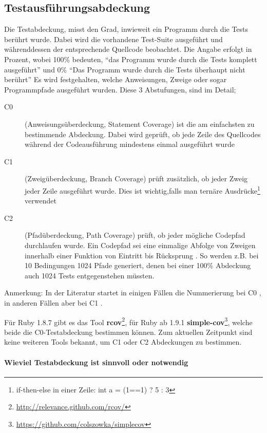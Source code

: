 \subsection{Testausführungsabdeckung}
\label{sec:coverage}
Die Testabdeckung, misst den Grad, inwieweit ein Programm durch die Tests berührt wurde. Dabei wird die vorhandene Test-Suite ausgeführt und währenddessen der entsprechende Quellcode beobachtet. Die Angabe erfolgt in Prozent, wobei 100\% bedeuten, "`das Programm wurde durch die Tests komplett ausgeführt"' und 0\% "`Das Programm wurde durch die Tests überhaupt nicht berührt"'  Es wird festgehalten, welche Anweisungen, Zweige oder sogar Programmpfade ausgeführt wurden. Diese 3 Abstufungen, sind im Detail;
\begin{description}
 \item[C0] (Anweisungsüberdeckung, Statement Coverage) ist die am einfachsten zu bestimmende Abdeckung. Dabei wird geprüft, ob jede Zeile des Quellcodes während der Codeausführung mindestens einmal ausgeführt wurde
 \item[C1] (Zweigüberdeckung, Branch Coverage) prüft zusätzlich, ob jeder Zweig jeder Zeile ausgeführt wurde. Dies ist wichtig,falls man ternäre Ausdrücke\footnote{if-then-else in einer Zeile: int a = (1==1) ? 5 : 3} verwendet
 \item[C2] (Pfadüberdeckung, Path Coverage) prüft, ob jeder mögliche Codepfad durchlaufen wurde. Ein Codepfad sei eine einmalige Abfolge von Zweigen innerhalb einer Funktion von Eintritt bis Rücksprung \citep{steve_cornett_code_1996}. So werden z.B. bei 10 Bedingungen 1024 Pfade generiert, denen bei einer 100\% Abdeckung auch 1024 Tests entgegenstehen müssten.
 \end{description}
 Anmerkung: In der Literatur startet in einigen Fällen die Nummerierung bei C0 \citep{catherine_powell_abakas_2008}, in anderen Fällen aber bei C1 \citep{steve_cornett_code_1996}.

 Für Ruby 1.8.7 gibt es das Tool \textbf{rcov}\footnote{\url{http://relevance.github.com/rcov/}}, für Ruby ab 1.9.1 \textbf{simple-cov}\footnote{\url{https://github.com/colszowka/simplecov}}, welche beide die C0-Testabdeckung bestimmen können. Zum aktuellen Zeitpunkt sind keine weiteren Tools bekannt, um C1 oder C2 Abdeckungen zu bestimmen.
 \paragraph{Wieviel Testabdeckung ist sinnvoll oder notwendig}

